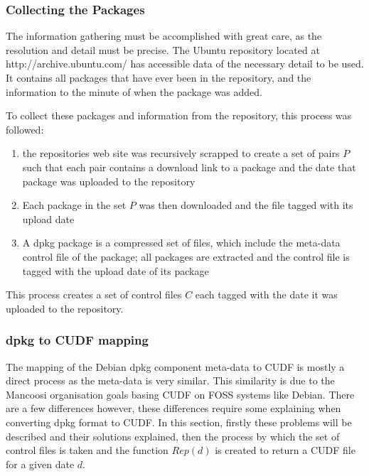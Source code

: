 \subsubsection{Collecting the Packages}
The information gathering must be accomplished with great care, as the resolution and detail must be precise.
The Ubuntu repository located at http://archive.ubuntu.com/ has accessible data of the necessary detail to be used.
It contains all packages that have ever been in the repository, and the information to the minute of when the package was added.

To collect these packages and information from the repository, this process was followed:
\begin{enumerate}
  \item the repositories web site was recursively scrapped to create a set of pairs $P$ 
  such that each pair contains a download link to a package and the date that package was uploaded to the repository
  \item Each package in the set $P$ was then downloaded and the file tagged with its upload date
  \item A dpkg package is a compressed set of files, 
  which include the meta-data control file of the package; all packages are extracted and the control file is tagged with the upload date of its package 
\end{enumerate}

This process creates a set of control files $C$ each tagged with the date it was uploaded to the repository.

\subsubsection{dpkg to CUDF mapping}
The mapping of the Debian dpkg component meta-data to CUDF is mostly a direct process as the meta-data is very similar.
This similarity is due to the Mancoosi organisation goals basing CUDF on FOSS systems like Debian.  
There are a few differences however, these differences require some explaining when converting dpkg format to CUDF.
In this section, firstly these problems will be described and their solutions explained, 
then the process by which the set of control files is taken and the function $Rep(d)$ is created to return a CUDF file for a given date $d$.

